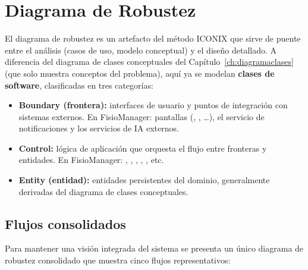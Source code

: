 
\chapter{Diagrama de Robustez}\label{ch:diagramarobustez}

El diagrama de robustez es un artefacto del método ICONIX que sirve de puente entre el análisis (casos de uso, modelo conceptual) y el diseño detallado. A diferencia del diagrama de clases conceptuales del Capítulo~\ref{ch:diagramaclases} (que solo muestra conceptos del problema), aquí ya se modelan \textbf{clases de software}, clasificadas en tres categorías:

\begin{itemize}
  \item \textbf{Boundary (frontera):} interfaces de usuario y puntos de integración con sistemas externos. En FisioManager: pantallas (, , \ldots), el servicio de notificaciones y los servicios de IA externos.
  \item \textbf{Control:} lógica de aplicación que orquesta el flujo entre fronteras y entidades. En FisioManager: , , , , , etc.
  \item \textbf{Entity (entidad):} entidades persistentes del dominio, generalmente derivadas del diagrama de clases conceptuales.
\end{itemize}

\section{Flujos consolidados}

Para mantener una visión integrada del sistema se presenta un único diagrama de robustez consolidado que muestra cinco flujos representativos:

